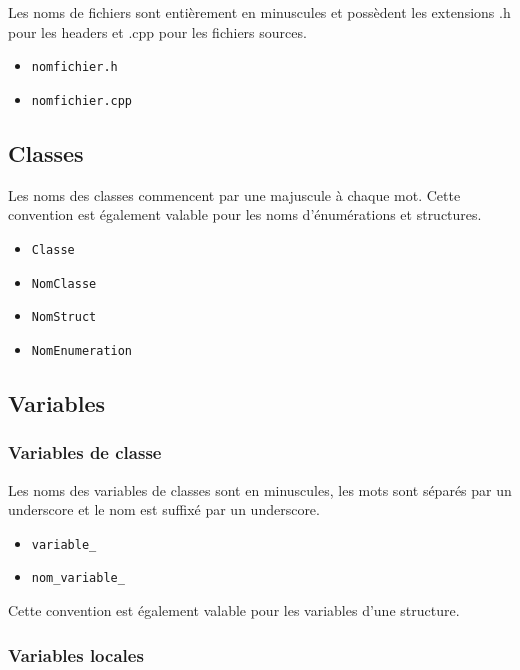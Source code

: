 \documentclass[]{article}
\begin{document}
Les noms de fichiers sont entièrement en minuscules
et possèdent les extensions .h
pour les headers et .cpp pour les fichiers sources.

\begin{itemize}
	\item \texttt{nomfichier.h}
	\item \texttt{nomfichier.cpp}
\end{itemize}

\subsection{Classes}

Les noms des classes commencent par une majuscule à chaque mot.
Cette convention est également valable pour les noms 
d'énumérations et structures.

\begin{itemize}
	\item \texttt{Classe}
	\item \texttt{NomClasse}
	\item \texttt{NomStruct}
	\item \texttt{NomEnumeration}
\end{itemize}

\newpage

\subsection{Variables}

\subsubsection{Variables de classe}

Les noms des variables de classes sont en minuscules, les mots sont 
séparés par un underscore et le nom est suffixé par un underscore.

\begin{itemize}
	\item \texttt{variable\_}
	\item \texttt{nom\_variable\_}
\end{itemize}

Cette convention est également valable pour les variables d'une
structure.

\subsubsection{Variables locales}
\end{document}
